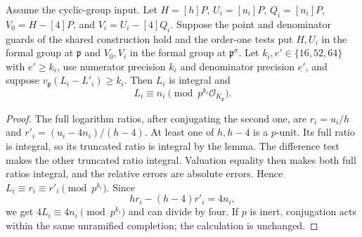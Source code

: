 \begin{corollary}
Assume the cyclic-group input. Let $H=[h]P$, $U_i=[u_i]P$,
$Q_i=[n_i]P$, $V_0=H-[4]P$, and $V_i=U_i-[4]Q_i$.
Suppose the point and denominator guards of the shared construction
hold and the order-one tests put $H,U_i$ in the formal group at
$\mathfrak p$ and $V_0,V_i$ in the formal group at
$\mathfrak p^\sigma$. Let $k_i,e'\in\{16,52,64\}$ with $e'\ge k_i$,
use numerator precision $k_i$ and denominator precision $e'$, and suppose
$v_{\mathfrak p}(L_i-L'_i)\ge k_i$.
Then $L_i$ is integral and
\[
 L_i\equiv n_i\pmod{p^{k_i}\mathcal O_{K_{\mathfrak p}}}.
\]
\end{corollary}

\begin{proof}
The full logarithm ratios, after conjugating the second one, are
$r_i=u_i/h$ and $r'_i=(u_i-4n_i)/(h-4)$. At least one of $h,h-4$
is a $p$-unit. Its full ratio is integral, so its truncated ratio
is integral by the lemma. The difference test makes the other
truncated ratio integral. Valuation equality then makes both full
ratios integral, and the relative errors are absolute errors.
Hence $L_i\equiv r_i\equiv r'_i\pmod{p^{k_i}}$. Since
\[
 h r_i-(h-4)r'_i=4n_i,
\]
we get $4L_i\equiv4n_i\pmod{p^{k_i}}$ and can divide by four.
If $p$ is inert, conjugation acts within the same unramified
completion; the calculation is unchanged.
\end{proof}

